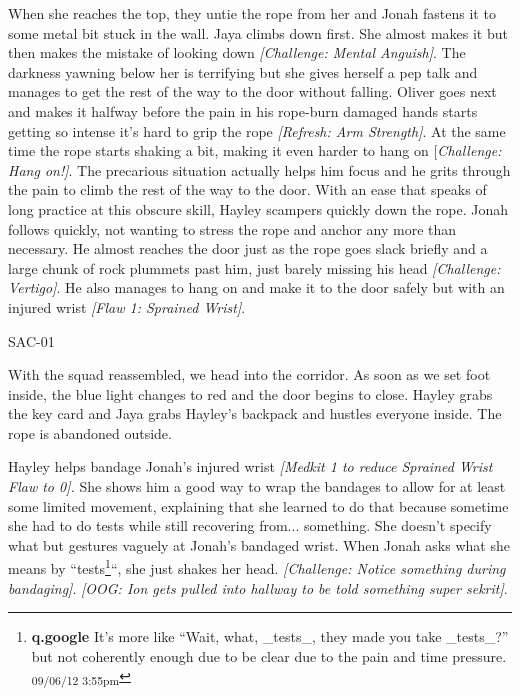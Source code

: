 When she reaches the top, they untie the rope from her and Jonah fastens it to some metal bit stuck in the wall.  Jaya climbs down first.  She almost makes it but then makes the mistake of looking down \textit{{[}Challenge: Mental Anguish{]}}.  The darkness yawning below her is terrifying but she gives herself a pep talk and manages to get the rest of the way to the door without falling.  Oliver goes next and makes it halfway before the pain in his rope-burn damaged hands starts getting so intense it's hard to grip the rope \textit{{[}Refresh: Arm Strength{]}}.  At the same time the rope starts shaking a bit, making it even harder to hang on {[}\textit{Challenge: Hang on!{]}}.  The precarious situation actually helps him focus and he grits through the pain to climb the rest of the way to the door.   With an ease that speaks of long practice at this obscure skill, Hayley scampers quickly down the rope.  Jonah follows quickly, not wanting to stress the rope and anchor any more than necessary.  He almost reaches the door just as the rope goes slack briefly and a large chunk of rock plummets past him, just barely missing his head \textit{{[}Challenge: Vertigo{]}}.  He also manages to hang on and make it to the door safely but with an injured wrist \textit{{[}Flaw 1: Sprained Wrist{]}}.



 {\LARGE SAC-01 } 



With the squad reassembled, we head into the corridor.  As soon as we set foot inside, the blue light changes to red and the door begins to close.  Hayley grabs the key card and Jaya grabs Hayley's backpack and hustles everyone inside.  The rope is abandoned outside.



Hayley helps bandage Jonah's injured wrist \textit{{[}Medkit 1 to reduce Sprained Wrist Flaw to 0{]}.}  She shows him a good way to wrap the bandages to allow for at least some limited movement, explaining that she learned to do that because sometime she had to do tests while still recovering from... something.  She doesn't specify what but gestures vaguely at Jonah's bandaged wrist.  When Jonah asks what she means by ``tests\footnote{\textbf{q.google }It's more like ``Wait, what, \_tests\_, they made you take \_tests\_?'' but not coherently enough due to be clear due to the pain and time pressure. \textsubscript{09/06/12 3:55pm}}``, she just shakes her head. \textit{{[}Challenge: Notice something during bandaging{]}}.  \textit{{[}OOG: Ion gets pulled into hallway to be told something super sekrit{]}}.




